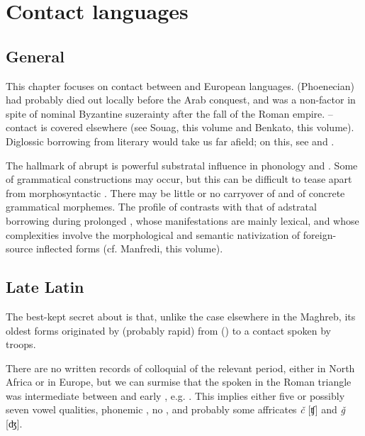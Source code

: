\documentclass[output=paper]{langsci/langscibook}
\begin{document}
\section{Contact languages}

\subsection{General}

This chapter focuses on contact between  and European languages.  (Phoenecian) had probably died out locally before the Arab conquest, and  was a non-factor in spite of nominal Byzantine suzerainty after the fall of the Roman empire. – contact is covered elsewhere (see Souag, this volume and Benkato, this volume). Diglossic borrowing from literary  would take us far afield; on this, see \citet{Sayahi2014} and \citet{Heath1989}.

The hallmark of abrupt  is powerful substratal influence in phonology and . Some  of grammatical constructions may occur, but this can be difficult to tease apart from morphosyntactic . There may be little or no carryover of  and of concrete grammatical morphemes. The profile of  contrasts with that of adstratal borrowing during prolonged , whose manifestations are mainly lexical, and whose complexities involve the morphological and semantic nativization of foreign-source inflected forms (cf. Manfredi, this volume).

\subsection{Late Latin}

The best-kept secret about  is that, unlike the case elsewhere in the Maghreb, its oldest forms originated by  (probably rapid) from  () to a contact  spoken by  troops.

There are no written records of colloquial  of the relevant period, either in North Africa or in Europe, but we can surmise that the  spoken in the Roman triangle was intermediate between   and early  , e.g.  . This implies either five or possibly seven vowel qualities, phonemic , no , and probably some affricates \textit{č} [ʧ] and \textit{ǧ} [ʤ].
\end{document}
